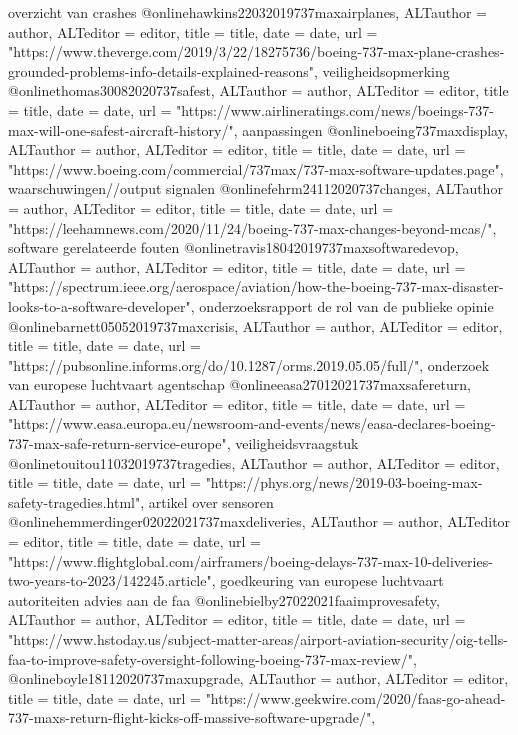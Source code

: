 {{{{{{{{{{{{{{overzicht van crashes
@online{hawkins22032019737maxairplanes,	ALTauthor = {author},	ALTeditor = {editor},	title = {title},	date = {date},	url = {"https://www.theverge.com/2019/3/22/18275736/boeing-737-max-plane-crashes-grounded-problems-info-details-explained-reasons"},}
veiligheidsopmerking
@online{thomas30082020737safest,	ALTauthor = {author},	ALTeditor = {editor},	title = {title},	date = {date},	url = {"https://www.airlineratings.com/news/boeings-737-max-will-one-safest-aircraft-history/"},}
aanpassingen
@online{boeing737maxdisplay,	ALTauthor = {author},	ALTeditor = {editor},	title = {title},	date = {date},	url = {"https://www.boeing.com/commercial/737max/737-max-software-updates.page"},}
waarschuwingen//output signalen
@online{fehrm24112020737changes,	ALTauthor = {author},	ALTeditor = {editor},	title = {title},	date = {date},	url = {"https://leehamnews.com/2020/11/24/boeing-737-max-changes-beyond-mcas/"},}
software gerelateerde fouten
@online{travis18042019737maxsoftwaredevop,	ALTauthor = {author},	ALTeditor = {editor},	title = {title},	date = {date},	url = {"https://spectrum.ieee.org/aerospace/aviation/how-the-boeing-737-max-disaster-looks-to-a-software-developer"},}
onderzoeksrapport
de rol van de publieke opinie
@online{barnett05052019737maxcrisis,	ALTauthor = {author},	ALTeditor = {editor},	title = {title},	date = {date},	url = {"https://pubsonline.informs.org/do/10.1287/orms.2019.05.05/full/"},}
onderzoek van europese luchtvaart agentschap
@online{easa27012021737maxsafereturn,	ALTauthor = {author},	ALTeditor = {editor},	title = {title},	date = {date},	url = {"https://www.easa.europa.eu/newsroom-and-events/news/easa-declares-boeing-737-max-safe-return-service-europe"},}
veiligheidsvraagstuk
@online{touitou11032019737tragedies,	ALTauthor = {author},	ALTeditor = {editor},	title = {title},	date = {date},	url = {"https://phys.org/news/2019-03-boeing-max-safety-tragedies.html"},}
artikel over sensoren
@online{hemmerdinger02022021737maxdeliveries,	ALTauthor = {author},	ALTeditor = {editor},	title = {title},	date = {date},	url = {"https://www.flightglobal.com/airframers/boeing-delays-737-max-10-deliveries-two-years-to-2023/142245.article"},}
goedkeuring van europese luchtvaart autoriteiten
advies aan de faa
@online{bielby27022021faaimprovesafety,	ALTauthor = {author},	ALTeditor = {editor},	title = {title},	date = {date},	url = {"https://www.hstoday.us/subject-matter-areas/airport-aviation-security/oig-tells-faa-to-improve-safety-oversight-following-boeing-737-max-review/"},}
@online{boyle18112020737maxupgrade,	ALTauthor = {author},	ALTeditor = {editor},	title = {title},	date = {date},	url = {"https://www.geekwire.com/2020/faas-go-ahead-737-maxs-return-flight-kicks-off-massive-software-upgrade/"},}
}}}}}}}}}}}}}}
